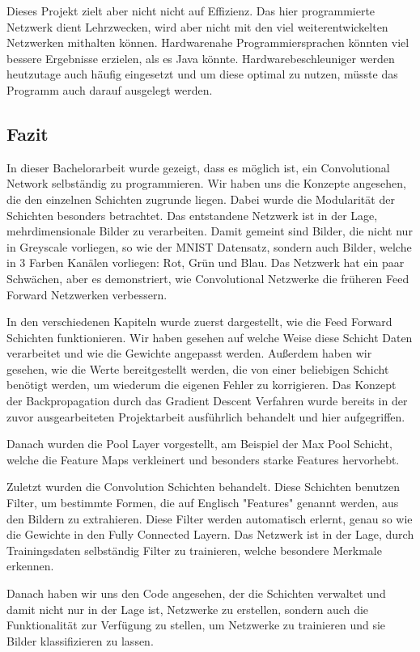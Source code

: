 \documentclass[12pt]{article}
\begin{document}
Dieses Projekt zielt aber nicht nicht auf Effizienz. Das hier programmierte Netzwerk dient Lehrzwecken, wird aber nicht mit den viel weiterentwickelten Netzwerken mithalten können. Hardwarenahe Programmiersprachen könnten viel bessere Ergebnisse erzielen, als es Java könnte. Hardwarebeschleuniger werden heutzutage auch häufig eingesetzt und um diese optimal zu nutzen, müsste das Programm auch darauf ausgelegt werden.

\subsection{Fazit}
In dieser Bachelorarbeit wurde gezeigt, dass es möglich ist, ein Convolutional Network selbständig zu programmieren. Wir haben uns die Konzepte angesehen, die den einzelnen Schichten zugrunde liegen. Dabei wurde die Modularität der Schichten besonders betrachtet. Das entstandene Netzwerk ist in der Lage, mehrdimensionale Bilder zu verarbeiten. Damit gemeint sind Bilder, die nicht nur in Greyscale vorliegen, so wie der MNIST Datensatz, sondern auch Bilder, welche in 3 Farben Kanälen vorliegen: Rot, Grün und Blau. Das Netzwerk hat ein paar Schwächen, aber es demonstriert, wie Convolutional Netzwerke die früheren Feed Forward Netzwerken verbessern.

In den verschiedenen Kapiteln wurde zuerst dargestellt, wie die Feed Forward Schichten funktionieren. Wir haben gesehen auf welche Weise diese Schicht Daten verarbeitet und wie die Gewichte angepasst werden. Außerdem haben wir gesehen, wie die Werte bereitgestellt werden, die von einer beliebigen Schicht benötigt werden, um wiederum die eigenen Fehler zu korrigieren. Das Konzept der Backpropagation durch das Gradient Descent Verfahren wurde bereits in der zuvor ausgearbeiteten Projektarbeit ausführlich behandelt und hier aufgegriffen.

Danach wurden die Pool Layer vorgestellt, am Beispiel der Max Pool Schicht, welche die Feature Maps verkleinert und besonders starke Features hervorhebt.

Zuletzt wurden die Convolution Schichten behandelt. Diese Schichten benutzen Filter, um bestimmte Formen, die auf Englisch "Features" genannt werden, aus den Bildern zu extrahieren. Diese Filter werden automatisch erlernt, genau so wie die Gewichte in den Fully Connected Layern. Das Netzwerk ist in der Lage, durch Trainingsdaten selbständig Filter zu trainieren, welche besondere Merkmale erkennen. 

Danach haben wir uns den Code angesehen, der die Schichten verwaltet und damit nicht nur in der Lage ist, Netzwerke zu erstellen, sondern auch die Funktionalität zur Verfügung zu stellen, um Netzwerke zu trainieren und sie Bilder klassifizieren zu lassen.
\end{document}
